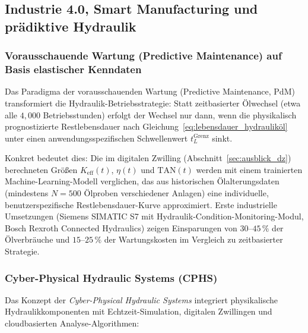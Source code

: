 ﻿\documentclass[a4paper,12pt]{scrreprt}
\theoremstyle{definition}
\begin{document}
\subsection{Industrie 4.0, Smart Manufacturing und prädiktive Hydraulik}

\subsubsection{Vorausschauende Wartung (Predictive Maintenance) auf Basis elastischer Kenndaten}

Das Paradigma der vorausschauenden Wartung (Predictive Maintenance,
PdM) transformiert die Hydraulik-Betriebsstrategie: Statt zeit\-basierter
Ölwechsel (etwa alle $4{,}000$ Betriebsstunden) erfolgt der
Wechsel nur dann, wenn die physikalisch prognostizierte Restlebensdauer
nach Gleichung~\eqref{eq:lebensdauer_hydrauliköl} unter einen
anwendungsspezifischen Schwellenwert $t_L^{\mathrm{Grenz}}$ sinkt.

Konkret bedeutet dies: Die im digitalen Zwilling (Abschnitt~\ref{sec:ausblick_dz})
berechneten Größen $K_{\mathrm{eff}}(t)$, $\eta(t)$ und $\mathrm{TAN}(t)$
werden mit einem trainierten Machine-Learning-Modell verglichen, das
aus historischen Ölalterungsdaten (mindestens $N = 500$ Ölproben
verschiedener Anlagen) eine individuelle, benutzerspezifische
Restlebensdauer-Kurve approximiert. Erste industrielle Umsetzungen
(Siemens SIMATIC S7 mit Hydraulik-Condition-Monitoring-Modul,
Bosch Rexroth Connected Hydraulics) zeigen Einsparungen von
$30$--$45\,\%$ der Ölverbräuche und $15$--$25\,\%$ der Wartungskosten
im Vergleich zu zeitbasierter Strategie.

\subsubsection{Cyber-Physical Hydraulic Systems (CPHS)}

Das Konzept der \emph{Cyber-Physical Hydraulic Systems} integriert
physikalische Hydraulikkomponenten mit Echtzeit-Simulation, digitalen
Zwillingen und cloudbasierten Analyse-Algorithmen:
\end{document}
